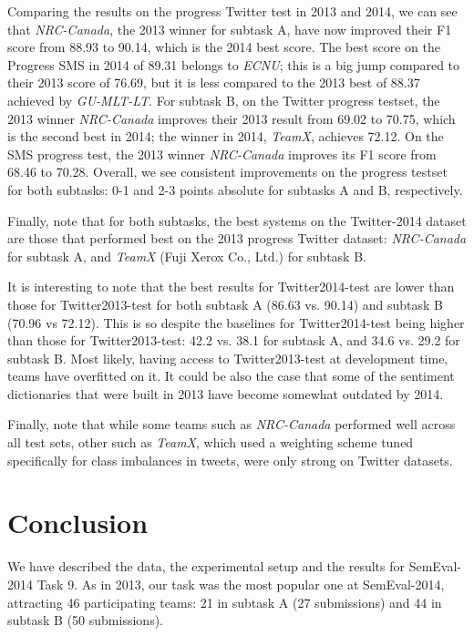 \documentclass[11pt]{article}
\begin{document}
Comparing the results on the progress Twitter test in 2013 and 2014, we can see that \emph{NRC-Canada}, the 2013 winner for subtask A,
have now improved their F1 score from 88.93 to 90.14, which is the 2014 best score.
The best score on the Progress SMS in 2014 of 89.31 belongs to \emph{ECNU}; this is a big jump compared to their 2013 score of 76.69,
but it is less compared to the 2013 best of 88.37 achieved by \emph{GU-MLT-LT}.
For subtask B, on the Twitter progress testset,
the 2013 winner \emph{NRC-Canada} improves their 2013 result from 69.02 to 70.75, which is the second best in 2014;
the winner in 2014, \emph{TeamX}, achieves 72.12.
On the SMS progress test, the 2013 winner \emph{NRC-Canada} improves its F1 score from 68.46 to 70.28.
Overall, we see consistent improvements on the progress testset for both subtasks: 0-1 and 2-3 points absolute for subtasks A and B, respectively.

Finally, note that for both subtasks, the best systems on the Twitter-2014 dataset are those that performed best on the 2013 progress Twitter dataset: \emph{NRC-Canada} for subtask A, and \emph{TeamX} (Fuji Xerox Co., Ltd.) for subtask B.

It is interesting to note that the best results for Twitter2014-test are lower than those for Twitter2013-test
for both subtask A (86.63 vs. 90.14) and subtask B (70.96 vs 72.12).
This is so despite the baselines for Twitter2014-test being higher than those for Twitter2013-test:
42.2 vs. 38.1 for subtask A, and 34.6 vs. 29.2 for subtask B.
Most likely, having access to Twitter2013-test at development time, teams have overfitted on it.
It could be also the case that some of the sentiment dictionaries that were built in 2013
have become somewhat outdated by 2014.

Finally, note that while some teams such as \emph{NRC-Canada} performed well across all test sets,
other such as \emph{TeamX}, which used a weighting scheme tuned specifically for class imbalances in tweets,
were only strong on Twitter datasets.


\section{Conclusion}

We have described the data, the experimental setup and the results for SemEval-2014 Task 9. As in 2013, our task was the most popular one at SemEval-2014, attracting 46 participating teams: 21 in subtask A (27 submissions) and 44 in subtask B (50 submissions).
\end{document}
